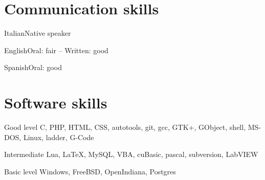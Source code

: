 \documentclass{tccv}
\begin{document}
\section{Communication skills}

\begin{factlist}
\item{Italian}{Native speaker}
\item{English}{Oral: fair -- Written: good}
\item{Spanish}{Oral: good}
\end{factlist}

\section{Software skills}

\begin{factlist}

\item{Good level}
     {C, PHP, HTML, CSS, autotools, git, gcc, GTK+, GObject, shell,
      MS-DOS, Linux, ladder, G-Code}

\item{Intermediate}
     {Lua, \LaTeX, MySQL, VBA, cuBasic, pascal, subversion, LabVIEW}

\item{Basic level}
     {Windows, FreeBSD, OpenIndiana, Postgres}

\end{factlist}
\end{document}
